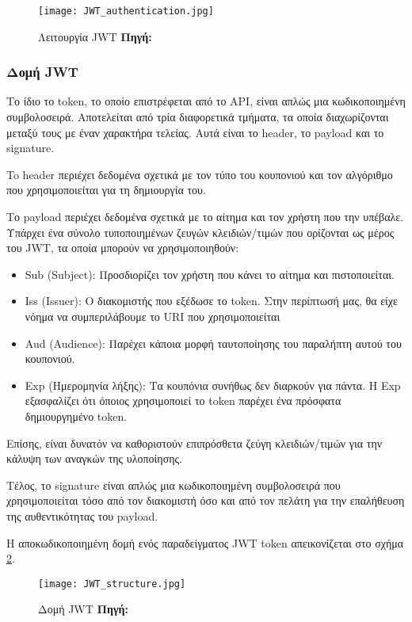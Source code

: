\begin{figure}[h]
	\centering
	\texttt{[image: JWT\_authentication.jpg]}
	\caption[{Λειτουργία JWT}]{Λειτουργία JWT \textbf{Πηγή:} \cite{fig_JWT_authentication}}
	\label{fig:JWT_authentication}
\end{figure}

\subsubsection{Δομή JWT}
Το ίδιο το token, το οποίο επιστρέφεται από το API, είναι απλώς μια κωδικοποιημένη συμβολοσειρά. Αποτελείται από τρία διαφορετικά τμήματα, τα οποία διαχωρίζονται μεταξύ τους με έναν χαρακτήρα τελείας. Αυτά είναι το header, το payload και το signature.

To header περιέχει δεδομένα σχετικά με τον τύπο του κουπονιού και τον αλγόριθμο που χρησιμοποιείται για τη δημιουργία του.

Το payload περιέχει δεδομένα σχετικά με το αίτημα και τον χρήστη που την υπέβαλε. Υπάρχει ένα σύνολο τυποποιημένων ζευγών κλειδιών/τιμών που ορίζονται ως μέρος του JWT, τα οποία μπορούν να χρησιμοποιηθούν:
\begin{itemize}
  \item Sub (Subject): Προσδιορίζει τον χρήστη που κάνει το αίτημα και πιστοποιείται.
  \item Iss (Issuer): Ο διακομιστής που εξέδωσε το token. Στην περίπτωσή μας, θα είχε νόημα να συμπεριλάβουμε το URI που χρησιμοποιείται
  \item Aud (Audience): Παρέχει κάποια μορφή ταυτοποίησης του παραλήπτη αυτού του κουπονιού.
  \item Exp (Ημερομηνία λήξης): Τα κουπόνια συνήθως δεν διαρκούν για πάντα. Η Exp εξασφαλίζει ότι όποιος χρησιμοποιεί το token παρέχει ένα πρόσφατα δημιουργημένο token.
\end{itemize}
Επίσης, είναι δυνατόν να καθοριστούν επιπρόσθετα ζεύγη κλειδιών/τιμών για την κάλυψη των αναγκών της υλοποίησης.

Τέλος, το signature είναι απλώς μια κωδικοποιημένη συμβολοσειρά που χρησιμοποιείται τόσο από τον διακομιστή όσο και από τον πελάτη για την επαλήθευση της αυθεντικότητας του payload.

Η αποκωδικοποιημένη δομή ενός παραδείγματος JWT token απεικονίζεται στο σχήμα \ref{fig:JWT_structure}.

\begin{figure}[h]
	\centering
	\texttt{[image: JWT\_structure.jpg]}
	\caption[{Δομή JWT}]{Δομή JWT \textbf{Πηγή:} \cite{fig_JWT_structure}}
	\label{fig:JWT_structure}
\end{figure}

